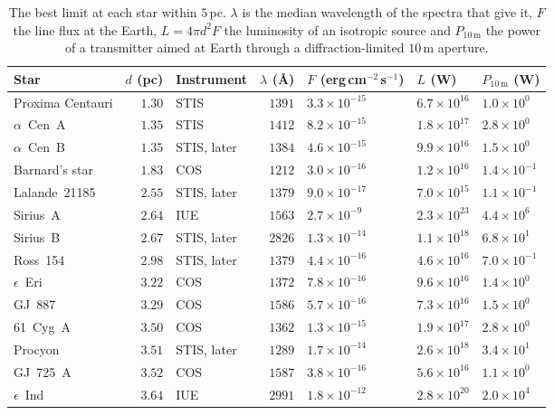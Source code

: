 \documentclass[3p,11pt]{elsarticle}
\newcommand{\flux}{erg\,cm$^{-2}$\,s$^{-1}$}
\begin{document}
\begin{table}[t]
\centering\small
\setlength{\tabcolsep}{5pt}
\caption{The best limit at each star within $5$\,pc. $\lambda$ is the median wavelength
of the spectra that give it, $F$ the line flux at the Earth, $L=4\pi d^2F$ the luminosity
of an isotropic source and $P_{10\,\mathrm{m}}$ the power of a transmitter aimed at
Earth through a diffraction-limited $10$\,m aperture.}
\label{tab:nearest}
\begin{tabular}{@{}lrlrlll@{}}
\toprule
Star & $d$ (pc) & Instrument & $\lambda$ (\AA) & $F$ (\flux) & $L$ (W) & $P_{10\,\mathrm{m}}$ (W)\\
\midrule
Proxima Centauri & $1.30$ & STIS & $1391$ & $3.3\times10^{-15}$ & $6.7\times10^{16}$ & $1.0\times10^{0}$\\
$\alpha$~Cen~A & $1.35$ & STIS & $1412$ & $8.2\times10^{-15}$ & $1.8\times10^{17}$ & $2.8\times10^{0}$\\
$\alpha$~Cen~B & $1.35$ & STIS, later & $1384$ & $4.6\times10^{-15}$ & $9.9\times10^{16}$ & $1.5\times10^{0}$\\
Barnard's star & $1.83$ & COS & $1212$ & $3.0\times10^{-16}$ & $1.2\times10^{16}$ & $1.4\times10^{-1}$\\
Lalande~21185 & $2.55$ & STIS, later & $1379$ & $9.0\times10^{-17}$ & $7.0\times10^{15}$ & $1.1\times10^{-1}$\\
Sirius~A & $2.64$ & IUE & $1563$ & $2.7\times10^{-9}$ & $2.3\times10^{23}$ & $4.4\times10^{6}$\\
Sirius~B & $2.67$ & STIS, later & $2826$ & $1.3\times10^{-14}$ & $1.1\times10^{18}$ & $6.8\times10^{1}$\\
Ross~154 & $2.98$ & STIS, later & $1379$ & $4.4\times10^{-16}$ & $4.6\times10^{16}$ & $7.0\times10^{-1}$\\
$\epsilon$~Eri & $3.22$ & COS & $1372$ & $7.8\times10^{-16}$ & $9.6\times10^{16}$ & $1.4\times10^{0}$\\
GJ~887 & $3.29$ & COS & $1586$ & $5.7\times10^{-16}$ & $7.3\times10^{16}$ & $1.5\times10^{0}$\\
61~Cyg~A & $3.50$ & COS & $1362$ & $1.3\times10^{-15}$ & $1.9\times10^{17}$ & $2.8\times10^{0}$\\
Procyon & $3.51$ & STIS, later & $1289$ & $1.7\times10^{-14}$ & $2.6\times10^{18}$ & $3.4\times10^{1}$\\
GJ~725~A & $3.52$ & COS & $1587$ & $3.8\times10^{-16}$ & $5.6\times10^{16}$ & $1.1\times10^{0}$\\
$\epsilon$~Ind & $3.64$ & IUE & $2991$ & $1.8\times10^{-12}$ & $2.8\times10^{20}$ & $2.0\times10^{4}$\\

\end{tabular}
\end{table}
\end{document}
